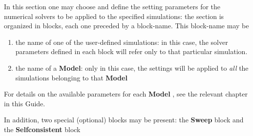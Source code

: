 In this section one may  choose and define the  setting parameters for  the numerical solvers to be applied to the  specified  simulations: the section is organized in blocks, each one preceded by a block-name.
This block-name may be 
\begin{enumerate}
 \item the  name  of one of the  user-defined simulations: in this case, the solver parameters defined in each block will refer only to that particular simulation.
\item the  name  of   a \TiberCAD   \textbf{Model}: only in  this  case, the settings  will  be  applied  to  \emph{all} the simulations belonging to  that \textbf{Model}
\end{enumerate}
For details on the available  parameters for each \textbf{Model} ,  see  the relevant  chapter in  this  Guide.



 In addition, two special (optional) blocks may be  present: the  \textbf{Sweep} block  and  the  \textbf{Selfconsistent} block



